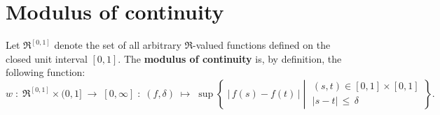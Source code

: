 

\section{Modulus of continuity}
\setcounter{theorem}{0}
\setcounter{equation}{0}

\renewcommand{\theenumi}{\roman{enumi}}
\renewcommand{\labelenumi}{\textnormal{(\theenumi)}$\;\;$}


\begin{definition}
\mbox{}\vskip 0.2cm
\noindent
Let $\Re^{[0,1]}$ denote the set of all arbitrary $\Re$-valued functions defined on the closed unit interval $[0,1]$.
The \textbf{modulus of continuity} is, by definition, the following function:
\begin{equation*}
w \;:\; \Re^{[0,1]} \times (0,1] \;\longrightarrow\; [0,\infty] \;:\;
(f,\delta) \;\longmapsto\;
\sup\left\{\;
	\left\vert\,f(s) - f(t)\,\right\vert
	\;\left\vert\;
	\begin{array}{c} (s,t) \in [0,1] \times [0,1] \\ \vert s - t \vert\,\leq\,\delta \end{array}
	\right.
\right\}.
\end{equation*}
\end{definition}

